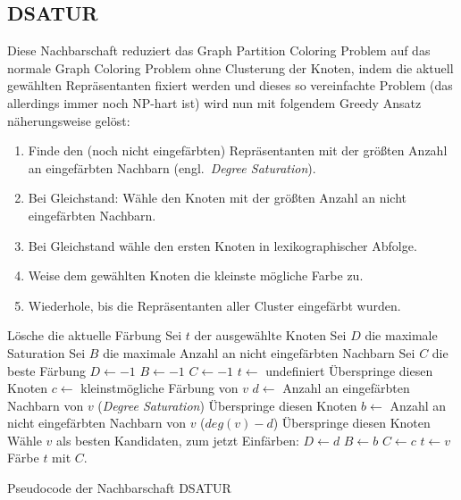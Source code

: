 \subsection{DSATUR}
\label{sec:dsatur}
Diese Nachbarschaft reduziert das Graph Partition Coloring Problem auf das normale Graph Coloring Problem ohne Clusterung der Knoten, indem die aktuell gewählten Repräsentanten fixiert werden und dieses so vereinfachte Problem (das allerdings immer noch NP-hart ist) wird nun mit folgendem Greedy Ansatz näherungsweise gelöst:

\begin{enumerate}
    \item Finde den (noch nicht eingefärbten) Repräsentanten mit der größten Anzahl an eingefärbten Nachbarn (engl.\ \textit{Degree Saturation}).
    \item Bei Gleichstand: Wähle den Knoten mit der größten Anzahl an nicht eingefärbten Nachbarn.
    \item Bei Gleichstand wähle den ersten Knoten in lexikographischer Abfolge.
    \item Weise dem gewählten Knoten die kleinste mögliche Farbe zu.
    \item Wiederhole, bis die Repräsentanten aller Cluster eingefärbt wurden.
\end{enumerate}

\begin{algorithm}
\begin{algorithmic}[1]
\State Lösche die aktuelle Färbung
\State Sei $t$ der ausgewählte Knoten
\State Sei $D$ die maximale Saturation
\State Sei $B$ die maximale Anzahl an nicht eingefärbten Nachbarn
\State Sei $C$ die beste Färbung
\State $D \leftarrow -1$
\State $B \leftarrow -1$
\State $C \leftarrow -1$
\State $t \leftarrow $ undefiniert
\State Überspringe diesen Knoten
\Else
\State $c\leftarrow$ kleinstmögliche Färbung von $v$
\State $d\leftarrow$ Anzahl an eingefärbten Nachbarn von $v$ (\textit{Degree Saturation})
\State Überspringe diesen Knoten
\EndIf
\State $b\leftarrow$ Anzahl an nicht eingefärbten Nachbarn von $v$ ($deg(v) - d$)
\State Überspringe diesen Knoten
\EndIf
\State Wähle $v$ als besten Kandidaten, zum jetzt Einfärben:
\State $D \leftarrow d$
\State $B \leftarrow b$
\State $C \leftarrow c$
\State $t \leftarrow v$
\EndIf
\EndFor
\State Färbe $t$ mit $C$.
\EndFor
\end{algorithmic}
\caption{Pseudocode der Nachbarschaft DSATUR}
\end{algorithm}
